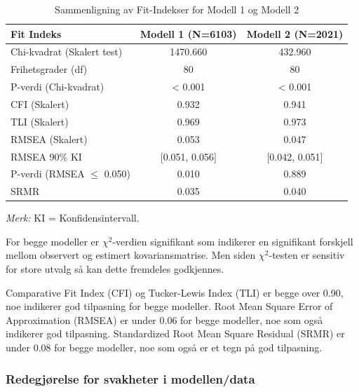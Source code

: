 \documentclass[
  12pt,
  a4paper,
  DIV=11,
  numbers=noendperiod]{scrartcl}
\begin{document}
\begin{table}[htbp]
\centering
\caption{Sammenligning av Fit-Indekser for Modell 1 og Modell 2}
\label{tab:fit_comparison_model1_model2}
\begin{tabular}{@{}lcc@{}}
\toprule
Fit Indeks                      & Modell 1 (N=6103) & Modell 2 (N=2021) \\
\midrule
Chi-kvadrat (Skalert test)      & 1470.660          & 432.960           \\
Frihetsgrader (df)              & 80                & 80                \\
P-verdi (Chi-kvadrat)           & < 0.001           & < 0.001           \\
CFI (Skalert)                   & 0.932             & 0.941             \\
TLI (Skalert)                   & 0.969             & 0.973             \\
RMSEA (Skalert)                 & 0.053             & 0.047             \\
RMSEA 90\% KI                   & [0.051, 0.056]    & [0.042, 0.051]    \\
P-verdi (RMSEA $\le$ 0.050)     & 0.010             & 0.889             \\
SRMR                            & 0.035             & 0.040             \\
\bottomrule
\end{tabular}
\raggedright
\footnotesize{%
\textit{Merk:} KI = Konfidensintervall.
}
\end{table}

For begge modeller er \(\chi^2\)-verdien signifikant som indikerer en
signifikant forskjell mellom observert og estimert kovariansmatrise. Men
siden \(\chi^2\)-testen er sensitiv for store utvalg så kan dette
fremdeles godkjennes.

Comparative Fit Index (CFI) og Tucker-Lewis Index (TLI) er begge over
0.90, noe indikerer god tilpasning for begge modeller. Root Mean Square
Error of Approximation (RMSEA) er under 0.06 for begge modeller, noe som
også indikerer god tilpasning. Standardized Root Mean Square Residual
(SRMR) er under 0.08 for begge modeller, noe som også er et tegn på god
tilpasning.

\subsubsection{Redegjørelse for svakheter i
modellen/data}\label{redegjuxf8relse-for-svakheter-i-modellendata}
\end{document}
